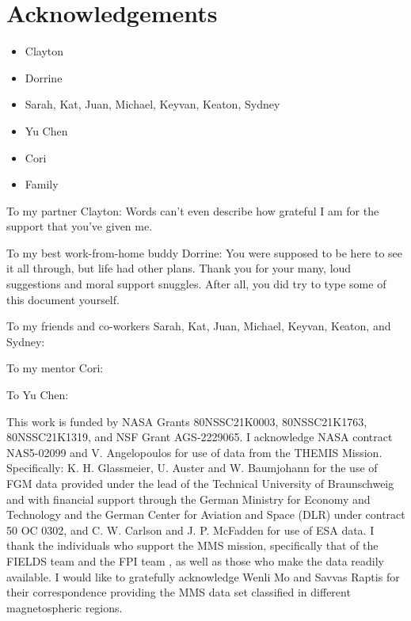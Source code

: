 \chapter{Acknowledgements}
\doublespacing


\begin{itemize}
    \item Clayton
    \item Dorrine
    \item Sarah, Kat, Juan, Michael, Keyvan, Keaton, Sydney
    \item Yu Chen
    \item Cori
    \item Family
\end{itemize}

To my partner Clayton: Words can't even describe how grateful I am for the support that you've given me.

To my best work-from-home buddy Dorrine: You were supposed to be here to see it all through, but life had other plans. Thank you for your many, loud suggestions and moral support snuggles. After all, you did try to type some of this document yourself.

To my friends and co-workers Sarah, Kat, Juan, Michael, Keyvan, Keaton, and Sydney: 

To my mentor Cori: 

To Yu Chen:



This work is funded by NASA Grants 80NSSC21K0003, 80NSSC21K1763, 80NSSC21K1319, and NSF Grant AGS‐2229065. I acknowledge NASA contract NAS5-02099 and V. Angelopoulos for use of data from the THEMIS Mission. Specifically: K. H. Glassmeier, U. Auster and W. Baumjohann for the use of FGM data \citep{Auster:2008} provided under the lead of the Technical University of Braunschweig and with financial support through the German Ministry for Economy and Technology and the German Center for Aviation and Space (DLR) under contract 50 OC 0302, and C. W. Carlson and J. P. McFadden for use of ESA \citep{McFadden:2008} data. I thank the individuals who support the MMS mission, specifically that of the FIELDS team \citep{Torbert:2016} and the FPI team \citep{Pollock:2016}, as well as those who make the data readily available. I would like to gratefully acknowledge Wenli Mo and Savvas Raptis for their correspondence providing the MMS data set classified in different magnetospheric regions. 


